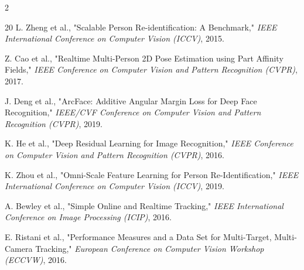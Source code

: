 \documentclass[a4paper,13pt]{article}
\begin{document}
\begin{multicols}{2}
\begin{thebibliography}{20}
L. Zheng et al., "Scalable Person Re-identification: A Benchmark," \textit{IEEE International Conference on Computer Vision (ICCV)}, 2015.

Z. Cao et al., "Realtime Multi-Person 2D Pose Estimation using Part Affinity Fields," \textit{IEEE Conference on Computer Vision and Pattern Recognition (CVPR)}, 2017.

J. Deng et al., "ArcFace: Additive Angular Margin Loss for Deep Face Recognition," \textit{IEEE/CVF Conference on Computer Vision and Pattern Recognition (CVPR)}, 2019.

K. He et al., "Deep Residual Learning for Image Recognition," \textit{IEEE Conference on Computer Vision and Pattern Recognition (CVPR)}, 2016.

K. Zhou et al., "Omni-Scale Feature Learning for Person Re-Identification," \textit{IEEE International Conference on Computer Vision (ICCV)}, 2019.

A. Bewley et al., "Simple Online and Realtime Tracking," \textit{IEEE International Conference on Image Processing (ICIP)}, 2016.

E. Ristani et al., "Performance Measures and a Data Set for Multi-Target, Multi-Camera Tracking," \textit{European Conference on Computer Vision Workshop (ECCVW)}, 2016.

\end{thebibliography}

\end{multicols}
\end{document}
